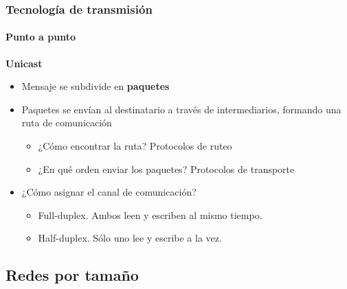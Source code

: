 \documentclass[letter]{beamer}
\begin{document}
\begin{frame}
  \frametitle{Tecnología de transmisión}
  \framesubtitle{Punto a punto}

  {\bf Unicast}
  \begin{itemize}
    \item Mensaje se subdivide en {\bf paquetes}
    \item Paquetes se envían al destinatario a través de intermediarios,
          formando una ruta de comunicación
          \begin{itemize}
            \item ¿Cómo encontrar la ruta? Protocolos de ruteo
            \item ¿En qué orden enviar los paquetes? Protocolos de transporte
          \end{itemize}
    \item ¿Cómo asignar el canal de comunicación?
      \begin{itemize}
        \item Full-duplex. Ambos leen y escriben al mismo tiempo.
        \item Half-duplex. Sólo uno lee y escribe a la vez.
      \end{itemize}
  \end{itemize}

\end{frame}

\subsection{Redes por tamaño}
\end{document}
